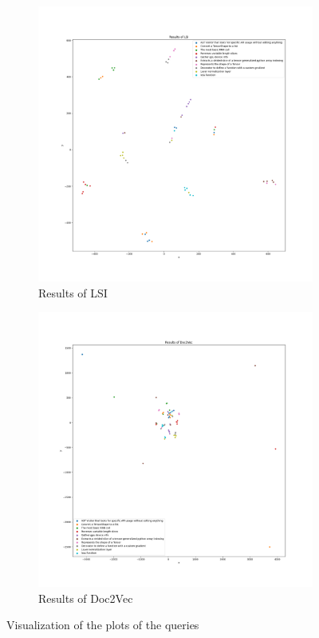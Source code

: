 \documentclass [14 pt]{article}
\begin{document}
\begin{figure}[h]
\centering
\begin{subfigure}[t]{0.45\textwidth}
\centering
\includegraphics[width=\textwidth]{../res/plot_lsi.png}
\caption{Results of LSI}\label{fig:lsi}
\end{subfigure}
\hfil
\begin{subfigure}[t]{0.45\textwidth}
\centering
\includegraphics[width=\textwidth]{../res/plot_doc2vec.png}
\caption{Results of Doc2Vec}\label{fig:doc2vec}
\end{subfigure}
\caption{Visualization of the plots of the queries}
\label{fig:plots}
\end{figure}
\end{document}
